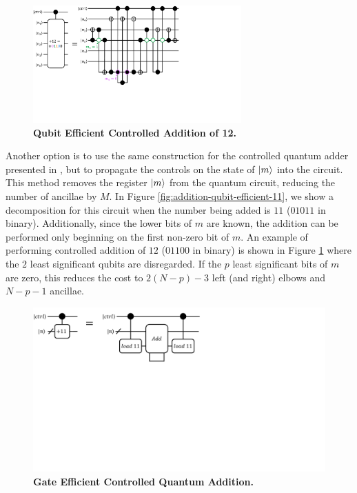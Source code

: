 \begin{figure}
    \centering
    \includegraphics[width=8cm]{figures/ctrl-add-12-qubit-efficient.pdf}
    \caption{
        \textbf{Qubit Efficient Controlled Addition of 12.} 
    }
    \label{fig:addition-qubit-efficient-12}
\end{figure}

Another option is to use the same construction for the controlled quantum adder presented in \cite{gidney2018halving}, but to propagate the controls on the state of $\ket{m}$ into the circuit.
This method removes the register $\ket{m}$ from the quantum circuit, reducing the number of ancillae by $M$.
In Figure \ref{fig:addition-qubit-efficient-11}, we show a decomposition for this circuit when the number being added is $11$ ($01011$ in binary).
Additionally, since the lower bits of $m$ are known, the addition can be performed only beginning on the first non-zero bit of $m$.
An example of performing controlled addition of $12$ ($01100$ in binary) is shown in Figure \ref{fig:addition-qubit-efficient-12} where the $2$ least significant qubits are disregarded.
If the $p$ least significant bits of $m$ are zero, this reduces the cost to $2(N - p) - 3$ left (and right) elbows and $N - p - 1$ ancillae.

\begin{figure}
    \centering
    \includegraphics[width=12cm]{figures/ctrl-add-11-gate-efficient.pdf}
    \caption{
        \textbf{Gate Efficient Controlled Quantum Addition.} 
    }
    \label{fig:addition-gate-efficient}
\end{figure}

